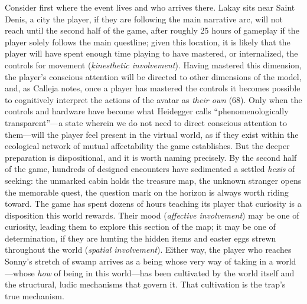 Consider first where the event lives and who arrives there. Lakay sits near Saint Denis, a city the player, if they are following the main narrative arc, will not reach until the second half of the game, after roughly 25 hours of gameplay if the player solely follows the main questline; given this location, it is likely that the player will have spent enough time playing to have mastered, or internalized, the controls for movement (\textit{kinesthetic involvement}). Having mastered this dimension, the player's conscious attention will be directed to other dimensions of the model, and, as Calleja notes, once a player has mastered the controls it becomes possible to cognitively interpret the actions of the avatar as \textit{their own} (68). Only when the controls and hardware have become what Heidegger calls ``phenomenologically transparent''---a state wherein we do not need to direct conscious attention to them---will the player feel present in the virtual world, as if they exist within the ecological network of mutual affectability the game establishes. But the deeper preparation is dispositional, and it is worth naming precisely. By the second half of the game, hundreds of designed encounters have sedimented a settled \textit{hexis} of seeking: the unmarked cabin holds the treasure map, the unknown stranger opens the memorable quest, the question mark on the horizon is always worth riding toward. The game has spent dozens of hours teaching its player that curiosity is a disposition this world rewards. Their mood (\textit{affective involvement}) may be one of curiosity, leading them to explore this section of the map; it may be one of determination, if they are hunting the hidden items and easter eggs strewn throughout the world (\textit{spatial involvement}). Either way, the player who reaches Sonny's stretch of swamp arrives as a being whose very way of taking in a world---whose \textit{how} of being in this world---has been cultivated by the world itself and the structural, ludic mechanisms that govern it. That cultivation is the trap's true mechanism.
